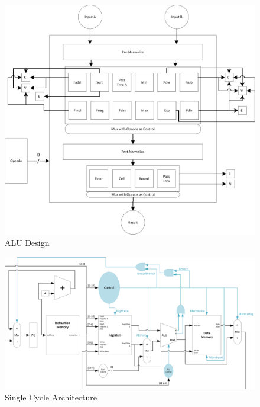 \documentclass[letter,14pt]{article}
\begin{document}
\newpage
\appendix
\appendixpage
\addappheadtotoc

	\begin{figure}[H]
	\begin{center}
	\includegraphics[width=1\linewidth]{ALU.png}
	\caption*{ALU Design}
	\end{center}
	\end{figure}

	\begin{landscape}
	\begin{figure}[H]
	\begin{center}
	\includegraphics[width=1\linewidth]{SingleCycleArch.png}
	\caption*{Single Cycle Architecture}
	\end{center}
	\end{figure}
	\end{landscape}
\end{document}
